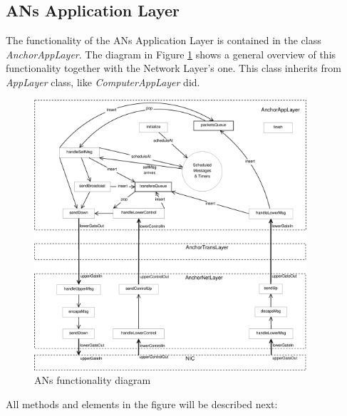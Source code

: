 \subsection{\acp{AN} Application Layer}

The functionality of the \acp{AN} Application Layer is contained in the class \textit{AnchorAppLayer}. The diagram in Figure \ref{fig:ANschema} 
shows a general overview of this functionality together with the Network Layer's one. This class inherits from \textit{AppLayer} class, like
\textit{ComputerAppLayer} did.

\begin{figure}[ht]
 \begin{center}
  \includegraphics[width=0.9\textwidth]{ANschema.eps}
 \end{center}
 \caption{\acp{AN} functionality diagram}
 \label{fig:ANschema}
\end{figure}

All methods and elements in the figure will be described next:

